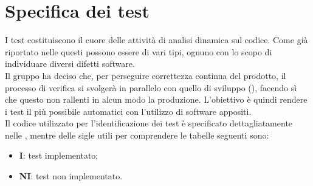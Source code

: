 \section{Specifica dei test}
I test costituiscono il cuore delle attività di analisi dinamica sul codice. Come già riportato nelle  questi possono essere di vari tipi, ognuno con lo scopo di individuare diversi difetti software. \\
Il gruppo \Gruppo{} ha deciso che, per perseguire correttezza continua del prodotto, il processo di verifica si svolgerà in parallelo con quello di sviluppo (), facendo sì che questo non rallenti in alcun modo la produzione. L'obiettivo è quindi rendere i test il più possibile automatici con l'utilizzo di software appositi. \\
Il codice utilizzato per l'identificazione dei test è specificato dettagliatamente nelle , mentre delle sigle utili per comprendere le tabelle seguenti sono:
\begin{itemize}
	\item \textbf{I}: test implementato;
	\item \textbf{NI}: test non implementato.
\end{itemize} 






